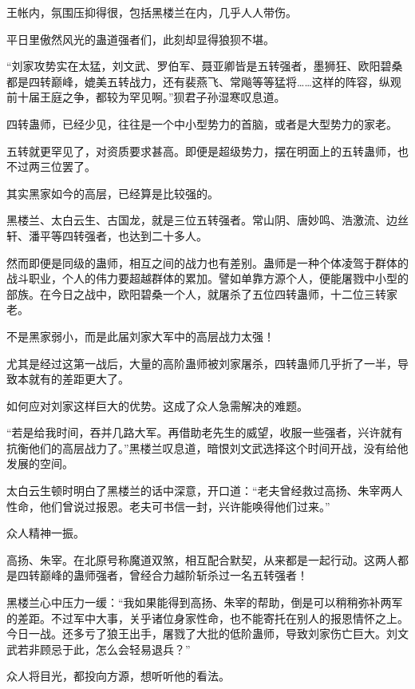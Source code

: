 
\begin{this_body}

王帐内，氛围压抑得很，包括黑楼兰在内，几乎人人带伤。

平日里傲然风光的蛊道强者们，此刻却显得狼狈不堪。

“刘家攻势实在太猛，刘文武、罗伯军、聂亚卿皆是五转强者，墨狮狂、欧阳碧桑都是四转巅峰，媲美五转战力，还有裴燕飞、常飚等等猛将……这样的阵容，纵观前十届王庭之争，都较为罕见啊。”狈君子孙湿寒叹息道。

四转蛊师，已经少见，往往是一个中小型势力的首脑，或者是大型势力的家老。

五转就更罕见了，对资质要求甚高。即便是超级势力，摆在明面上的五转蛊师，也不过两三位罢了。

其实黑家如今的高层，已经算是比较强的。

黑楼兰、太白云生、古国龙，就是三位五转强者。常山阴、唐妙鸣、浩激流、边丝轩、潘平等四转强者，也达到二十多人。

然而即便是同级的蛊师，相互之间的战力也有差别。蛊师是一种个体凌驾于群体的战斗职业，个人的伟力要超越群体的累加。譬如单靠方源个人，便能屠戮中小型的部族。在今日之战中，欧阳碧桑一个人，就屠杀了五位四转蛊师，十二位三转家老。

不是黑家弱小，而是此届刘家大军中的高层战力太强！

尤其是经过这第一战后，大量的高阶蛊师被刘家屠杀，四转蛊师几乎折了一半，导致本就有的差距更大了。

如何应对刘家这样巨大的优势。这成了众人急需解决的难题。

“若是给我时间，吞并几路大军。再借助老先生的威望，收服一些强者，兴许就有抗衡他们的高层战力了。”黑楼兰叹息道，暗恨刘文武选择这个时间开战，没有给他发展的空间。

太白云生顿时明白了黑楼兰的话中深意，开口道：“老夫曾经救过高扬、朱宰两人性命，他们曾说过报恩。老夫可书信一封，兴许能唤得他们过来。”

众人精神一振。

高扬、朱宰。在北原号称魔道双煞，相互配合默契，从来都是一起行动。这两人都是四转巅峰的蛊师强者，曾经合力越阶斩杀过一名五转强者！

黑楼兰心中压力一缓：“我如果能得到高扬、朱宰的帮助，倒是可以稍稍弥补两军的差距。不过军中大事，关乎诸位身家性命，也不能寄托在别人的报恩情怀之上。今日一战。还多亏了狼王出手，屠戮了大批的低阶蛊师，导致刘家伤亡巨大。刘文武若非顾忌于此，怎么会轻易退兵？”

众人将目光，都投向方源，想听听他的看法。


\end{this_body}
